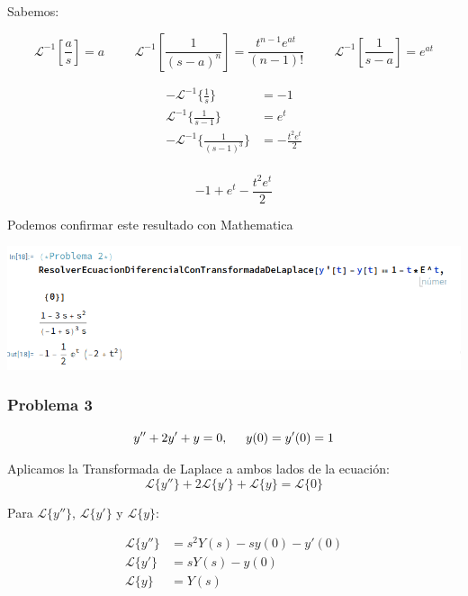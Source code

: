 \documentclass{article}
\begin{document}
Sabemos:

\[ \mathcal{L}^{-1}[\frac{a}{s}] = a \hspace{1cm} \mathcal{L}^{-1}[\frac{1}{(s-a)^n}] = \frac{t^{n-1}e^{at}}{(n-1)!} \hspace{1cm} \mathcal{L}^{-1}[\frac{1}{s-a}] = e^{at}\]

\begin{align*}
    -\mathcal{L}^{-1}\{\frac{1}{s}\}       & = -1                  \\
    \mathcal{L}^{-1}\{\frac{1}{s-1}\}      & = e^t                 \\
    -\mathcal{L}^{-1}\{\frac{1}{(s-1)^3}\} & = -\frac{t^2e^{t}}{2} \\
\end{align*}

\[-1 + e^t - \frac{t^2e^t}{2}\]

Podemos confirmar este resultado con Mathematica

\begin{center}
    \includegraphics[width=1\textwidth]{../ED 2/image2.png}
\end{center}

\newpage


\subsubsection{Problema 3}
\[y'' + 2y' + y = 0, \hspace{.5cm} y(0) = y'(0) = 1\]

Aplicamos la Transformada de Laplace a ambos lados de la ecuación:
\[\mathcal{L}\{y''\} + 2\mathcal{L}\{y'\} + \mathcal{L}\{y\} = \mathcal{L}\{0\}\]

Para \(\mathcal{L}\{y''\}\), \(\mathcal{L}\{y'\}\) y \(\mathcal{L}\{y\}\):

\begin{align*}
    \mathcal{L}\{y''\} & = s^2Y(s) - sy(0) - y'(0) \\
    \mathcal{L}\{y'\}  & = sY(s) - y(0)            \\
    \mathcal{L}\{y\}   & = Y(s)
\end{align*}
\end{document}
